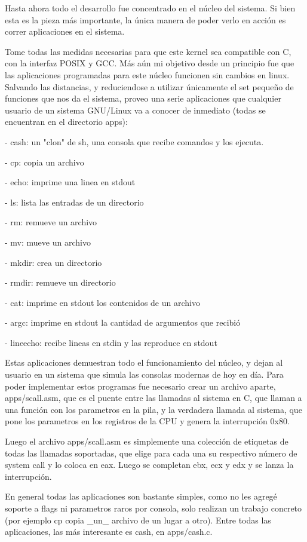 Hasta ahora todo el desarrollo fue concentrado en el núcleo del sistema. Si
bien esta es la pieza más importante, la única manera de poder verlo en acción
es correr aplicaciones en el sistema.

Tome todas las medidas necesarias para que este kernel sea compatible con C,
con la interfaz POSIX y GCC. Más aún mi objetivo desde un principio fue que las
aplicaciones programadas para este núcleo funcionen sin cambios en linux.
Salvando las distancias, y reduciendose a utilizar únicamente el set pequeño
de funciones que nos da el sistema, proveo una serie aplicaciones que cualquier
usuario de un sistema GNU/Linux va a conocer de inmediato (todas se encuentran
en el directorio apps):

- cash: un "clon" de sh, una consola que recibe comandos y los ejecuta.

- cp: copia un archivo

- echo: imprime una linea en stdout

- ls: lista las entradas de un directorio

- rm: remueve un archivo

- mv: mueve un archivo

- mkdir: crea un directorio

- rmdir: remueve un directorio

- cat: imprime en stdout los contenidos de un archivo

- argc: imprime en stdout la cantidad de argumentos que recibió

- lineecho: recibe lineas en stdin y las reproduce en stdout

Estas aplicaciones demuestran todo el funcionamiento del núcleo, y dejan al
usuario en un sistema que simula las consolas modernas de hoy en día. Para
poder implementar estos programas fue necesario crear un archivo aparte,
apps/scall.asm, que es el puente entre las llamadas al sistema en C, que llaman
a una función con los parametros en la pila, y la verdadera llamada al sistema,
que pone los parametros en los registros de la CPU y genera la interrupción
0x80.

Luego el archivo apps/scall.asm es simplemente una colección de etiquetas de
todas las llamadas soportadas, que elige para cada una su respectivo número de
system call y lo coloca en eax. Luego se completan ebx, ecx y edx y se lanza la
interrupción.

En general todas las aplicaciones son bastante simples, como no les agregé
soporte a flags ni parametros raros por consola, solo realizan un trabajo
concreto (por ejemplo cp copia \_un\_ archivo de un lugar a otro). Entre todas las
aplicaciones, las más interesante es cash, en apps/cash.c.

